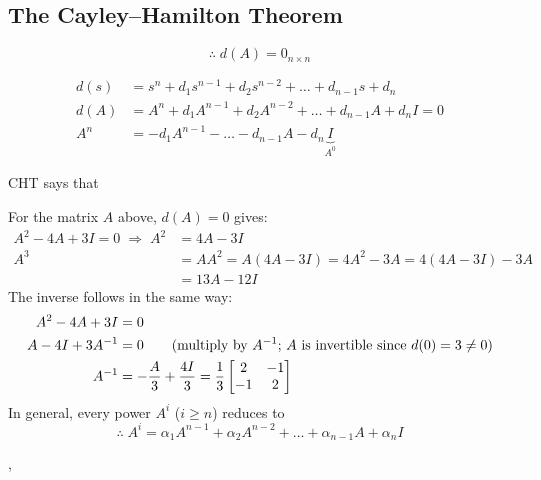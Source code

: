 \subsection{The Cayley--Hamilton Theorem}\label{ss:cht}
\begin{theorem}
\leavevmode{}
\[ \therefore\; d(A)=0_{n\times n} \]
\end{theorem}
\begin{align*}
d(s)&= s^n+d_1s^{n-1}+d_2s^{n-2}+\dots+d_{n-1}s+d_n\\
d(A)&= A^n+d_1A^{n-1}+d_2A^{n-2}+\dots+d_{n-1}A+d_nI = 0\\
A^n &= -d_1A^{n-1}-\dots-d_{n-1}A-d_n\underbrace{I}_{A^0}
\end{align*}
\begin{remark}
CHT says that 
\end{remark}
For the matrix $A$ above, $d(A)=0$ gives:
\begin{align*}
A^2-4A+3I=0 \;\Rightarrow\; A^2 &= 4A-3I\\[2pt]
A^3 &= AA^2 = A(4A-3I)=4A^2-3A = 4(4A-3I)-3A\\
&= 13A-12I
\end{align*}
The inverse follows in the same way:
\begin{align*}
A^2-4A+3I&=0\\
A-4I+3A^{-1}&=0 \qquad\text{(multiply by $A^{-1}$; $A$ is invertible since $d(0)=3\neq0$)}\\
A^{-1}&=-\frac{A}{3}+\frac{4I}{3}=\frac13\begin{bmatrix}2&-1\\-1&2\end{bmatrix}
\end{align*}
In general, every power $A^i$ ($i\ge n$) reduces to
\[
\therefore\; A^i = \alpha_1A^{n-1}+\alpha_2A^{n-2}+\dots+\alpha_{n-1}A+\alpha_nI
\]

\sep
